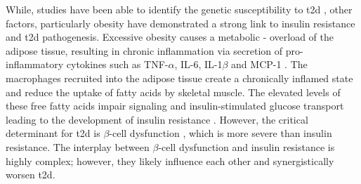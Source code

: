 While,  studies have been able to identify the genetic susceptibility to \gls{t2d} \textbf{\cite{grarup_genetic_2014, wang_genetic_2016}}, other factors, particularly obesity have demonstrated a strong link to insulin resistance and \gls{t2d} pathogenesis. Excessive obesity causes a metabolic - overload of the adipose tissue, resulting in chronic inflammation via secretion of pro-inflammatory cytokines such as TNF-$\alpha$, IL-6, IL-1$\beta$ and MCP-1 \textbf{\cite{guilherme_adipocyte_2008}}. The macrophages recruited into the adipose tissue create a chronically inflamed state and reduce the uptake of fatty acids by skeletal muscle. The elevated levels of these free fatty acids impair signaling and insulin-stimulated glucose transport leading to the development of insulin resistance \textbf{\cite{unger_lipotoxicity_1995,uysal_protection_1997,kanda_mcp-1_2006}}. However, the critical determinant for \gls{t2d} is $\beta$-cell dysfunction \textbf{\cite{tahrani_glycaemic_2010, khin_pancreatic_2023}}, which is more severe than insulin resistance. The interplay between $\beta$-cell dysfunction and insulin resistance is highly complex; however, they likely influence each other and synergistically worsen \gls{t2d}.\\  


